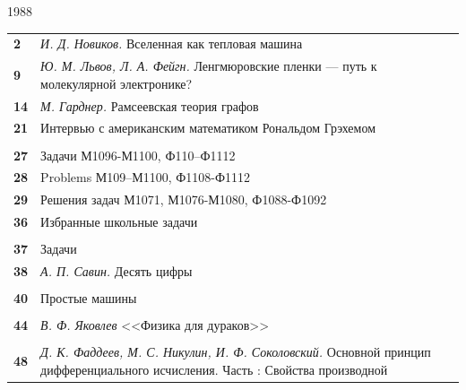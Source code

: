 \documentclass[10dd, a5paper]{article}
\begin{document}
\begin{minipage}[t][][b]{0.55\linewidth}

{\fontsize{20dd}{6dd}\selectfont
\hspace{20dd}1988

{\fontsize{30dd}{6dd}}
}
\vspace{1cm}

\fontsize{17dd}{6dd}\selectfont{В номере:}

\fontsize{7dd}{6dd}\selectfont
\begin{tabularx}{\linewidth}{lX}
{\bf 2} & {\itshape И. Д. Новиков.} Вселенная как тепловая машина\\
{\bf 9} & {\itshape Ю. М. Львов, Л. А. Фейгн.} Ленгмюровские пленки --- путь к молекулярной электронике?\\
{\bf 14} & {\itshape М. Гарднер.} Рамсеевская теория графов\\
{\bf 21} & {\itshape} Интервью с американским математиком Рональдом Грэхемом\\
& \vspace{1dd}{\bf Задачник <<Кванта>>}\\
{\bf 27} & Задачи М1096-М1100, Ф110--Ф1112\\
{\bf 28} & Problems М109--М1100, Ф1108-Ф1112\\
{\bf 29} & Решения задач М1071, М1076-М1080, Ф1088-Ф1092\\
{\bf 36} & Избранные школьные задачи\\
& \vspace{1dd}{\bf <<Кванта>> для младших школьников }\\
{\bf 37} & Задачи\\
{\bf 38} & {\itshape А. П. Савин.} Десять цифры\\
& \vspace{1dd}{\bf Калейдоском <<Кванта>>}\\
{\bf 40} & Простые машины\\
& \vspace{1dd}{\bf Лаборатория <<Кванта>>}\\
{\bf 44} & {\itshape В. Ф. Яковлев} <<Физика для дураков>>\\
& \vspace{1dd}{\bf Математический кружок}\\
{\bf 48} & {\itshape Д. К. Фаддеев, М. С. Никулин, И. Ф. Соколовский.} Основной принцип дифференциального исчисления. Часть  {\MakeUppercase{\romannumeral 2}}: Свойства производной\\

\end{tabularx}
\end{minipage}
\end{document}
